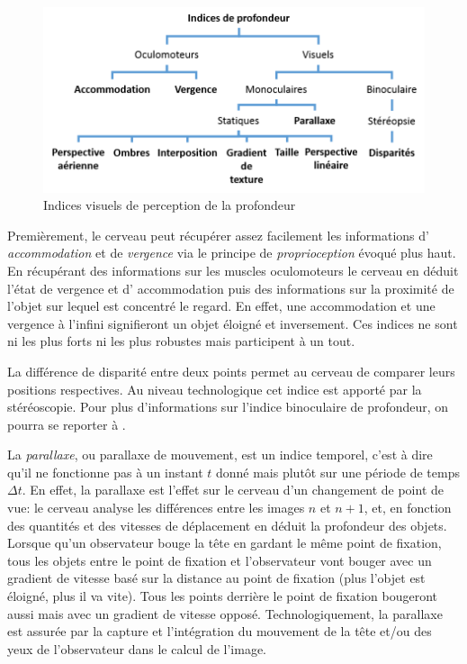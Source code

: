 	\begin{figure}
		\centering
		\includegraphics[scale=1]{Figures/IndicesProfondeur}
		\caption{Indices visuels de perception de la profondeur}
		\label{fig:indices_profondeur}
	\end{figure}
	
	\par Premièrement, le cerveau peut récupérer assez facilement les informations d' \textit{accommodation} et de \textit{vergence} via le principe de \textit{proprioception} évoqué plus haut. En récupérant des informations sur les muscles oculomoteurs le cerveau en déduit l'état de vergence et d' accommodation puis des informations sur la proximité de l'objet sur lequel est concentré le regard. En effet, une accommodation et une vergence à l'infini signifieront un objet éloigné et inversement. Ces indices ne sont ni les plus forts ni les plus robustes mais participent à un tout.
	
	\par La différence de disparité entre deux points permet au cerveau de comparer leurs positions respectives. Au niveau technologique cet indice est apporté par la stéréoscopie. Pour plus d'informations sur l'indice binoculaire de profondeur, on pourra se reporter à \citep{glassner_principles_1995}.
	
	\par La \textit{parallaxe}, ou parallaxe de mouvement, est un indice temporel, c'est à dire qu'il ne fonctionne pas à un instant $t$ donné mais plutôt sur une période de temps $\Delta t$. En effet, la parallaxe est l'effet sur le cerveau d'un changement de point de vue: le cerveau analyse les différences entre les images $n$ et $n+1$, et, en fonction des quantités et des vitesses de déplacement en déduit la profondeur des objets. Lorsque qu'un observateur bouge la tête en gardant le même point de fixation, tous les objets entre le point de fixation et l'observateur vont bouger avec un gradient de vitesse basé sur la distance au point de fixation (plus l'objet est éloigné, plus il va vite). Tous les points derrière le point de fixation bougeront aussi mais avec un gradient de vitesse opposé. Technologiquement, la parallaxe est assurée par la capture et l'intégration du mouvement de la tête et/ou des yeux de l'observateur dans le calcul de l'image.
	
